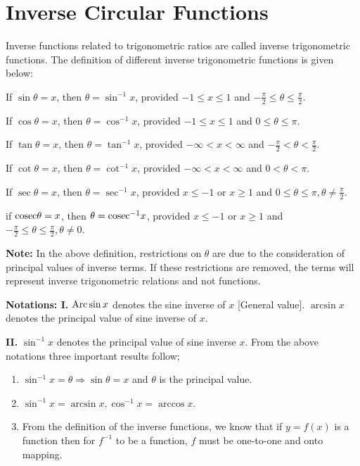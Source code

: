 \chapter{Inverse Circular Functions}
\begin{definition}
  Inverse functions related to trigonometric ratios are called inverse trigonometric functions. The definition of different
  inverse trigonometric functions is given below:

  If $\sin\theta = x$, then $\theta = \sin^{-1}x$, provided $-1\leq x\leq 1$ and $-\frac{\pi}{2}\leq\theta\leq\frac{\pi}{2}$.

  If $\cos\theta = x$, then $\theta = \cos^{-1}x$, provided $-1\leq x\leq 1$ and $0\leq\theta\leq\pi$.

  If $\tan\theta = x$, then $\theta = \tan^{-1}x$, provided $-\infty<x<\infty$ and $-\frac{\pi}{2}<\theta<\frac{\pi}{2}$.

  If $\cot\theta = x$, then $\theta = \cot^{-1}x$, provided $-\infty<x<\infty$ and $0<\theta<\pi$.

  If $\sec\theta = x$, then $\theta = \sec^{-1}x$, provided $x\leq -1$ or $x\geq 1$ and $0\leq \theta\leq
  \pi,\theta\neq\frac{\pi}{2}$.

  if ${\rm cosec}\theta = x$, then $\theta = {\rm cosec}^{-1}x$, provided $x\leq -1$ or $x\geq 1$ and $-\frac{\pi}{2}\leq\theta\leq
  \frac{\pi}{2}, \theta\neq0$.
\end{definition}

\textbf{Note:} In the above definition, restrictions on $\theta$ are due to the consideration of principal values of inverse
terms. If these restrictions are removed, the terms will represent inverse trigonometric relations and not functions.

\textbf{Notations: I.} ${\rm Arc}\sin x$ denotes the sine inverse of $x$ [General value]. $\arcsin x$ denotes the principal value
of sine inverse of $x$.

\textbf{II.} $\sin^{-1}x$ denotes the principal value of sine inverse $x$. From the above notations three important results follow;
\begin{enumerate}
\item $\sin^{-1}x = \theta \Rightarrow \sin\theta = x$ and $\theta$ is the principal value.
\item $\sin^{-1}x = \arcsin x, \cos^{-1}x = \arccos x$.
\item From the definition of the inverse functions, we know that if $y = f(x)$ is a function then for $f^{-1}$ to be a function,
  $f$ must be one-to-one and onto mapping.
\end{enumerate}

